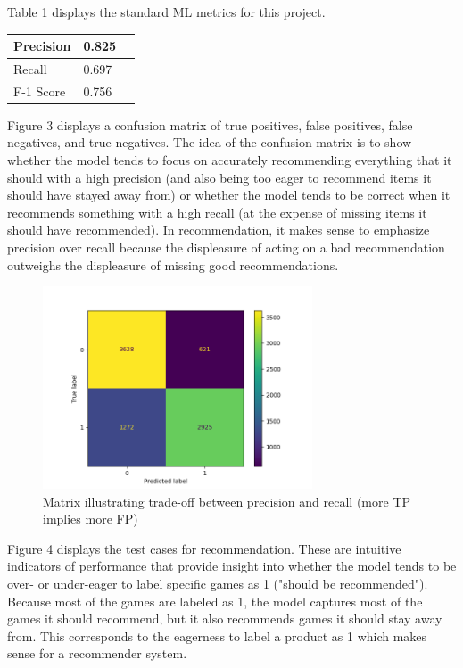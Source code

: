 \documentclass[10pt,twocolumn]{article}
\begin{document}
Table 1 displays the standard ML metrics for this project.

\begin{center}
\begin{tabular}{ | m{5em} | m{1cm}| m{1cm} | } 
  \hline
  Precision & 0.825 \\ 
  \hline
  Recall & 0.697 \\ 
  \hline
  F-1 Score & 0.756 \\ 
  \hline
\end{tabular}
\end{center}

Figure 3 displays a confusion matrix of true positives, false positives, false negatives, and true negatives. The idea of the confusion matrix is to show whether the model tends to focus on accurately recommending everything that it should with a high precision (and also being too eager to recommend items it should have stayed away from) or whether the model tends to be correct when it recommends something with a high recall (at the expense of missing items it should have recommended). In recommendation, it makes sense to emphasize precision over recall because the displeasure of acting on a bad recommendation outweighs the displeasure of missing good recommendations. 

\begin{figure}[h!]
\includegraphics[width=8cm, height=6cm]{conf_matrix_visual.png}
\centering
\caption{Matrix illustrating trade-off between precision and recall (more TP implies more FP)}
\end{figure}

Figure 4 displays the test cases for recommendation. These are intuitive indicators of performance that provide insight into whether the model tends to be over- or under-eager to label specific games as 1 ("should be recommended"). Because most of the games are labeled as 1, the model captures most of the games it should recommend, but it also recommends games it should stay away from. This corresponds to the eagerness to label a product as 1 which makes sense for a recommender system. 
\end{document}

